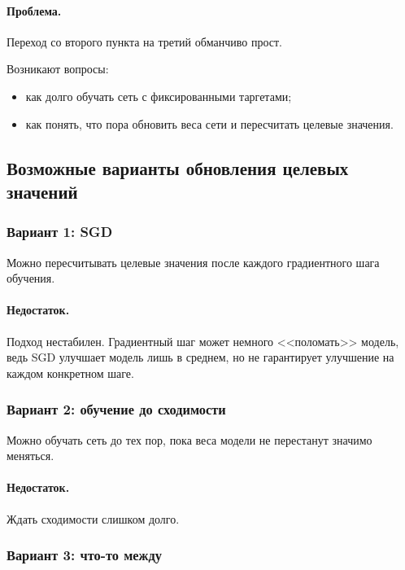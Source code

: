 \documentclass[12pt,a4paper]{article}
\begin{document}
\paragraph{Проблема.}

Переход со второго пункта на третий обманчиво прост.

Возникают вопросы:
\begin{itemize}
    \item как долго обучать сеть с фиксированными таргетами;
    \item как понять, что пора обновить веса сети и пересчитать целевые значения.
\end{itemize}

\subsection{Возможные варианты обновления целевых значений}

\subsubsection{Вариант 1: SGD}

Можно пересчитывать целевые значения после каждого градиентного шага обучения.

\paragraph{Недостаток.}

Подход нестабилен. Градиентный шаг может немного <<поломать>> модель, ведь SGD улучшает модель лишь в среднем, но не гарантирует улучшение на каждом конкретном шаге.

\subsubsection{Вариант 2: обучение до сходимости}

Можно обучать сеть до тех пор, пока веса модели не перестанут значимо меняться.

\paragraph{Недостаток.}

Ждать сходимости слишком долго.

\subsubsection{Вариант 3: что-то между}
\end{document}
